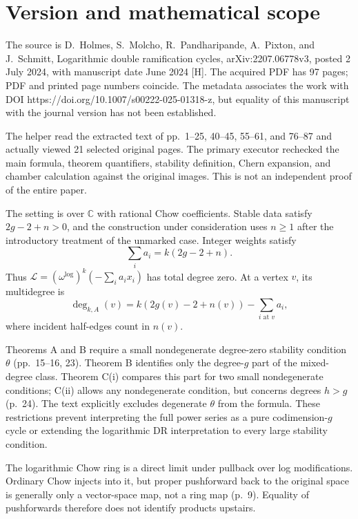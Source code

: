 \documentclass[10pt]{article}
\begin{document}
\section*{Version and mathematical scope}
The source is D. Holmes, S. Molcho, R. Pandharipande, A. Pixton, and J. Schmitt, Logarithmic double ramification cycles, arXiv:2207.06778v3, posted 2 July 2024, with manuscript date June 2024 [H]. The acquired PDF has 97 pages; PDF and printed page numbers coincide. The metadata associates the work with DOI https://doi.org/10.1007/s00222-025-01318-z, but equality of this manuscript with the journal version has not been established.\par
The helper read the extracted text of pp. 1–25, 40–45, 55–61, and 76–87 and actually viewed 21 selected original pages. The primary executor rechecked the main formula, theorem quantifiers, stability definition, Chern expansion, and chamber calculation against the original images. This is not an independent proof of the entire paper.\par
The setting is over \(\mathbb C\) with rational Chow coefficients. Stable data satisfy \(2g-2+n>0\), and the construction under consideration uses \(n\ge1\) after the introductory treatment of the unmarked case. Integer weights satisfy \[\sum_i a_i=k(2g-2+n).\] Thus \(\mathcal L=(\omega^{\log})^k(-\sum_i a_i x_i)\) has total degree zero. At a vertex \(v\), its multidegree is \[\deg_{k,A}(v)=k(2g(v)-2+n(v))-\sum_{i\text{ at }v}a_i,\] where incident half-edges count in \(n(v)\).\par
Theorems A and B require a small nondegenerate degree-zero stability condition \(\theta\) (pp. 15–16, 23). Theorem B identifies only the degree-\(g\) part of the mixed-degree class. Theorem C(i) compares this part for two small nondegenerate conditions; C(ii) allows any nondegenerate condition, but concerns degrees \(h>g\) (p. 24). The text explicitly excludes degenerate \(\theta\) from the formula. These restrictions prevent interpreting the full power series as a pure codimension-\(g\) cycle or extending the logarithmic DR interpretation to every large stability condition.\par
The logarithmic Chow ring is a direct limit under pullback over log modifications. Ordinary Chow injects into it, but proper pushforward back to the original space is generally only a vector-space map, not a ring map (p. 9). Equality of pushforwards therefore does not identify products upstairs.\par
\end{document}
